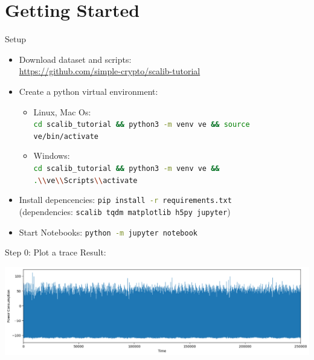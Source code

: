 \documentclass[aspectratio=169]{beamer}
\begin{document}
\section{Getting Started}
\begin{frame}{Setup}
    \begin{itemize}
        \item Download dataset and scripts:\\
            \url{https://github.com/simple-crypto/scalib-tutorial}
        \item Create a python virtual environment:
            \begin{itemize}
                    \item Linux, Mac Os:\\
                        \lstinline[language=sh]$cd scalib_tutorial && python3 -m venv ve && source ve/bin/activate$
                    \item Windows:\\
                        \lstinline[language=sh]$cd scalib_tutorial && python3 -m venv ve && .\\ve\\Scripts\\activate$
            \end{itemize}
        \item Install depencencies: \lstinline[language=sh]$pip install -r requirements.txt$ \\
            {\footnotesize (dependencies: \texttt{scalib tqdm matplotlib h5py jupyter})}
        \item Start Notebooks:
        \lstinline[language=sh]$python -m jupyter notebook$
    \end{itemize}
\end{frame}


\begin{frame}{Step 0: Plot a trace}
    Result:
    \begin{center}
        \includegraphics[width=\textwidth]{figures/res_step0.png}
    \end{center}
\end{frame}
\end{document}
